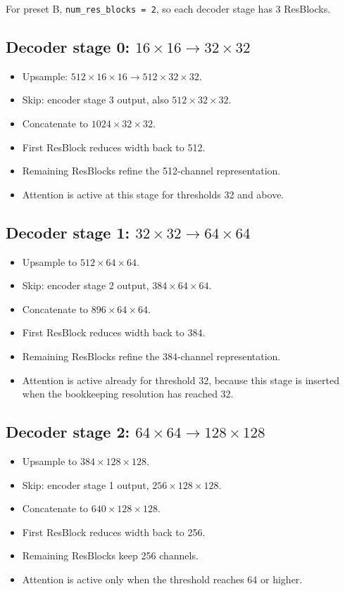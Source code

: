 \documentclass[11pt]{article}
\begin{document}
For preset B, \texttt{num\_res\_blocks = 2}, so each decoder stage has 3 ResBlocks.

\subsection{Decoder stage 0: $16 \times 16 \to 32 \times 32$}
\begin{itemize}
  \item Upsample: $512 \times 16 \times 16 \to 512 \times 32 \times 32$.
  \item Skip: encoder stage 3 output, also $512 \times 32 \times 32$.
  \item Concatenate to $1024 \times 32 \times 32$.
  \item First ResBlock reduces width back to 512.
  \item Remaining ResBlocks refine the 512-channel representation.
  \item Attention is active at this stage for thresholds 32 and above.
\end{itemize}

\subsection{Decoder stage 1: $32 \times 32 \to 64 \times 64$}
\begin{itemize}
  \item Upsample to $512 \times 64 \times 64$.
  \item Skip: encoder stage 2 output, $384 \times 64 \times 64$.
  \item Concatenate to $896 \times 64 \times 64$.
  \item First ResBlock reduces width back to 384.
  \item Remaining ResBlocks refine the 384-channel representation.
  \item Attention is active already for threshold 32, because this stage is inserted when the bookkeeping resolution has reached 32.
\end{itemize}

\subsection{Decoder stage 2: $64 \times 64 \to 128 \times 128$}
\begin{itemize}
  \item Upsample to $384 \times 128 \times 128$.
  \item Skip: encoder stage 1 output, $256 \times 128 \times 128$.
  \item Concatenate to $640 \times 128 \times 128$.
  \item First ResBlock reduces width back to 256.
  \item Remaining ResBlocks keep 256 channels.
  \item Attention is active only when the threshold reaches 64 or higher.
\end{itemize}
\end{document}
